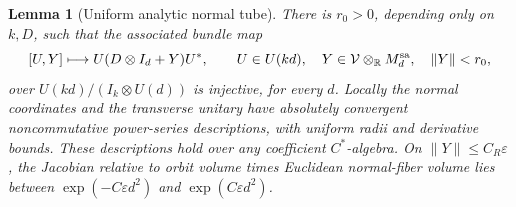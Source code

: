 \documentclass[11pt]{article}
\newtheorem{lemma}[theorem]{Lemma}
\theoremstyle{definition}\newtheorem{definition}[theorem]{Definition}
\theoremstyle{remark}\newtheorem{remark}[theorem]{Remark}
\newcommand{\eps}{\varepsilon}\newcommand{\id}{\mathrm{id}}
\begin{document}
\begin{lemma}[Uniform analytic normal tube]\label{lem:tube}
There is $r_0>0$, depending only on $k,D$, such that the associated
bundle map
\begin{equation}\label{eq:bundle}
 [U,Y]\longmapsto U(D\otimes I_d+Y)U^*,\qquad
 U\in U(kd),\quad Y\in\mathcal V\otimes_\mathbb R M_d^{\mathrm{sa}},\quad\|Y\|<r_0,
\end{equation}
over $U(kd)/(I_k\otimes U(d))$ is injective, for every $d$.
Locally the normal coordinates and the transverse unitary have
absolutely convergent noncommutative power-series descriptions, with
uniform radii and derivative bounds. These descriptions hold over
any coefficient $C^*$-algebra. On $\|Y\|\leq C_R\eps$, the Jacobian
relative to orbit volume times Euclidean normal-fiber volume lies between
$\exp(-C\eps d^2)$ and $\exp(C\eps d^2)$.
\end{lemma}
\end{document}
